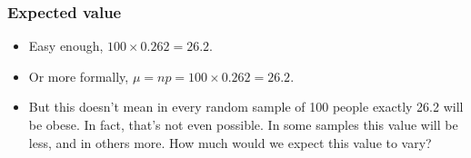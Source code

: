 \documentclass[slidestop,compress,mathserif]{beamer}
\begin{document}








\begin{frame}
\frametitle{Expected value}


\pause

\begin{itemize}

\item Easy enough, $100 \times 0.262 = 26.2$.

\pause

\item Or more formally, $\mu = np = 100 \times 0.262 = 26.2$.

\pause

\item But this doesn't mean in every random sample of 100 people exactly 26.2 will be obese. In fact, that's not even possible. In some samples this value will be less, and in others more. How much would we expect this value to vary?

\end{itemize}

\end{frame}
\end{document}
